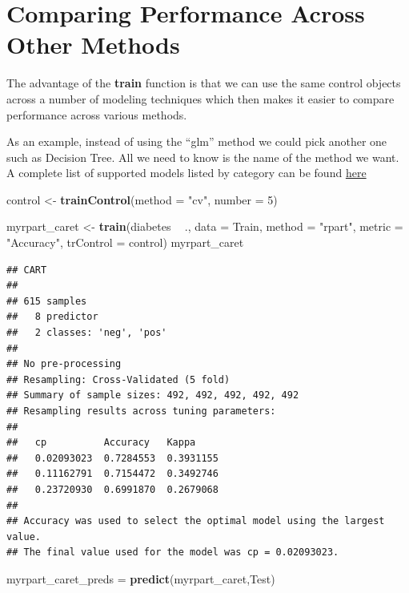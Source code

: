 \documentclass[
]{book}
\newenvironment{Shaded}{\begin{snugshade}}{\end{snugshade}}
\newcommand{\DataTypeTok}[1]{\textcolor[rgb]{0.13,0.29,0.53}{#1}}
\newcommand{\DecValTok}[1]{\textcolor[rgb]{0.00,0.00,0.81}{#1}}
\newcommand{\KeywordTok}[1]{\textcolor[rgb]{0.13,0.29,0.53}{\textbf{#1}}}
\newcommand{\NormalTok}[1]{#1}
\newcommand{\OperatorTok}[1]{\textcolor[rgb]{0.81,0.36,0.00}{\textbf{#1}}}
\newcommand{\StringTok}[1]{\textcolor[rgb]{0.31,0.60,0.02}{#1}}
\begin{document}
\hypertarget{comparing-performance-across-other-methods}{%
\section{Comparing Performance Across Other Methods}\label{comparing-performance-across-other-methods}}

The advantage of the \textbf{train} function is that we can use the same control objects across a number of modeling techniques which then makes it easier to compare performance across various methods.

As an example, instead of using the ``glm'' method we could pick another one such as Decision Tree. All we need to know is the name of the method we want. A complete list of supported models listed by category can be found \href{https://topepo.github.io/caret/available-models.html}{here}

\begin{Shaded}
\begin{Highlighting}[]
\NormalTok{control <-}\StringTok{ }\KeywordTok{trainControl}\NormalTok{(}\DataTypeTok{method =} \StringTok{"cv"}\NormalTok{, }\DataTypeTok{number =} \DecValTok{5}\NormalTok{)}

\NormalTok{myrpart_caret <-}\StringTok{ }\KeywordTok{train}\NormalTok{(diabetes }\OperatorTok{~}\StringTok{ }\NormalTok{.,}
                     \DataTypeTok{data =}\NormalTok{ Train,}
                     \DataTypeTok{method =} \StringTok{"rpart"}\NormalTok{,}
                     \DataTypeTok{metric =} \StringTok{"Accuracy"}\NormalTok{,}
                     \DataTypeTok{trControl =}\NormalTok{ control)}
\NormalTok{myrpart_caret}
\end{Highlighting}
\end{Shaded}

\begin{verbatim}
## CART 
## 
## 615 samples
##   8 predictor
##   2 classes: 'neg', 'pos' 
## 
## No pre-processing
## Resampling: Cross-Validated (5 fold) 
## Summary of sample sizes: 492, 492, 492, 492, 492 
## Resampling results across tuning parameters:
## 
##   cp          Accuracy   Kappa    
##   0.02093023  0.7284553  0.3931155
##   0.11162791  0.7154472  0.3492746
##   0.23720930  0.6991870  0.2679068
## 
## Accuracy was used to select the optimal model using the largest value.
## The final value used for the model was cp = 0.02093023.
\end{verbatim}

\begin{Shaded}
\begin{Highlighting}[]
\NormalTok{myrpart_caret_preds =}\StringTok{ }\KeywordTok{predict}\NormalTok{(myrpart_caret,Test)}
\end{Highlighting}
\end{Shaded}
\end{document}
